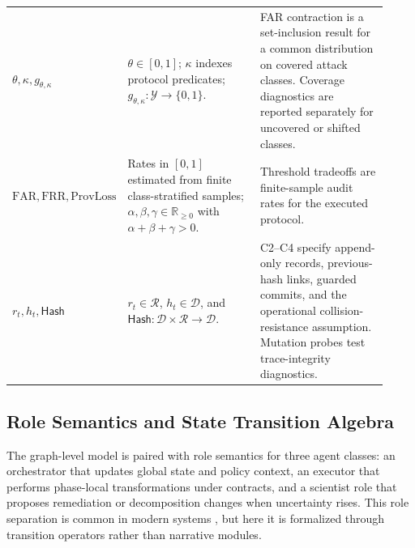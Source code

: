 \documentclass{article} %
\begin{document}
\begin{table}[t]
\begin{tabular}{p{0.18\linewidth}p{0.37\linewidth}p{0.37\linewidth}}
$\theta,\kappa,g_{\theta,\kappa}$ & $\theta\in[0,1]$; $\kappa$ indexes protocol predicates; $g_{\theta,\kappa}:\mathcal{Y}\to\{0,1\}$. & FAR contraction is a set-inclusion result for a common distribution on covered attack classes. Coverage diagnostics are reported separately for uncovered or shifted classes. \\
$\mathrm{FAR},\mathrm{FRR},\mathrm{ProvLoss}$ & Rates in $[0,1]$ estimated from finite class-stratified samples; $\alpha,\beta,\gamma\in\mathbb{R}_{\ge0}$ with $\alpha+\beta+\gamma>0$. & Threshold tradeoffs are finite-sample audit rates for the executed protocol. \\
$r_t,h_t,\mathsf{Hash}$ & $r_t\in\mathcal{R}$, $h_t\in\mathcal{D}$, and $\mathsf{Hash}:\mathcal{D}\times\mathcal{R}\to\mathcal{D}$. & C2--C4 specify append-only records, previous-hash links, guarded commits, and the operational collision-resistance assumption. Mutation probes test trace-integrity diagnostics. \\
\hline
\end{tabular}
\end{table}

\subsection{Role Semantics and State Transition Algebra}
The graph-level model is paired with role semantics for three agent classes: an orchestrator that updates global state and policy context, an executor that performs phase-local transformations under contracts, and a scientist role that proposes remediation or decomposition changes when uncertainty rises. This role separation is common in modern systems \citep{song2026,marozau2025,medeiros2025}, but here it is formalized through transition operators rather than narrative modules.
\end{document}
